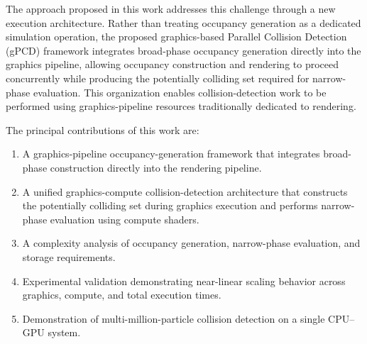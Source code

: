 The approach proposed in this work addresses this challenge through a
new execution architecture. Rather than treating occupancy generation
as a dedicated simulation operation, the proposed graphics-based
Parallel Collision Detection (gPCD) framework integrates broad-phase
occupancy generation directly into the graphics pipeline, allowing
occupancy construction and rendering to proceed concurrently while
producing the potentially colliding set required for narrow-phase
evaluation. This organization enables collision-detection work to be performed using
graphics-pipeline resources traditionally dedicated to rendering.


The principal contributions of this work are:

\begin{enumerate}

\item A graphics-pipeline occupancy-generation framework that integrates
broad-phase construction directly into the rendering pipeline.

\item A unified graphics-compute collision-detection architecture that
constructs the potentially colliding set during graphics execution and
performs narrow-phase evaluation using compute shaders.

\item A complexity analysis of occupancy generation, narrow-phase
evaluation, and storage requirements.

\item Experimental validation demonstrating near-linear scaling
behavior across graphics, compute, and total execution times.

\item Demonstration of multi-million-particle collision detection on a
single CPU--GPU system.

\end{enumerate}
